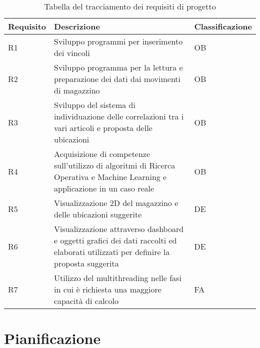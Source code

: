 \begin{table}
    \centering
    \begin{tabularx}{\textwidth}{|Y|Z|Y|}
    \hline
    \textbf{Requisito} & \textbf{Descrizione} & \textbf{Classificazione}\\
    \hline
    R1 & Sviluppo programmi per inserimento dei vincoli & OB \\
    \hline
    R2 & Sviluppo programma per la lettura e preparazione dei dati dai movimenti di magazzino & OB \\
    \hline
    R3 & Sviluppo del sistema di individuazione delle correlazioni tra i vari articoli e proposta delle ubicazioni & OB \\
    \hline
    R4 & Acquisizione di competenze sull’utilizzo di algoritmi di Ricerca Operativa e Machine Learning e applicazione in un caso reale & OB \\
    \hline
    R5 & Visualizzazione 2D del magazzino e delle ubicazioni suggerite & DE \\
    \hline
    R6 & Visualizzazione attraverso dashboard e oggetti grafici dei dati raccolti ed elaborati utilizzati per definire la proposta suggerita & DE \\
    \hline
    R7 & Utilizzo del multithreading nelle fasi in cui è richiesta una maggiore capacità di calcolo & FA \\
    \hline
    \end{tabularx}
    \caption{Tabella del tracciamento dei requisiti di progetto}
    \end{table}

\section{Pianificazione}

